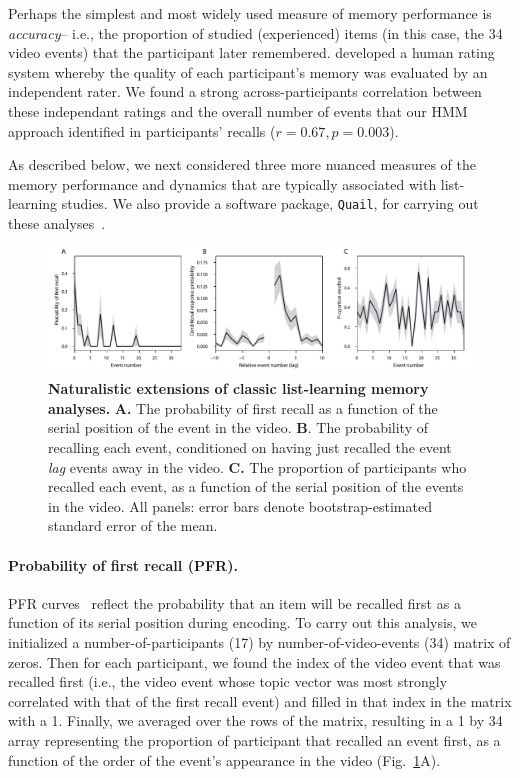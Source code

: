 \documentclass{article}
\begin{document}
Perhaps the simplest and most widely used measure of memory performance is \textit{accuracy}-- i.e., the proportion of studied (experienced) items (in this case, the 34 video events) that the participant later remembered.  \cite{ChenEtal17} developed a human rating system whereby the quality of each participant's memory was evaluated by an independent rater.  We found a strong across-participants correlation between these independant ratings and the overall number of events that our HMM approach identified in participants' recalls ($r = 0.67, p = 0.003$).

As described below, we next considered three more nuanced measures of the memory performance and dynamics that are typically associated with list-learning studies.  We also provide a software package, \texttt{Quail}, for carrying out these analyses~\citep{HeusEtal17b}.

\begin{figure}[tb]
\centering
\includegraphics[width=1\textwidth]{figs/list_learning}
\caption{\small \textbf{Naturalistic extensions of classic list-learning memory analyses.} \textbf{A.} The probability of first recall as a function of the serial position of the event in the video. \textbf{B}.  The probability of recalling each event, conditioned on having just recalled the event \textit{lag} events away in the video.  \textbf{C.} The proportion of participants who recalled each event, as a function of the serial position of the events in the video.  All panels: error bars denote bootstrap-estimated standard error of the mean.}
\label{fig:list-learning}
\end{figure}

\paragraph{Probability of first recall (PFR).}  PFR curves~\citep{WelcBurn24, PostPhil65, AtkiShif68} reflect the probability that an item will be recalled first as a function of its serial position during encoding. To carry out this analysis, we initialized a number-of-participants (17) by number-of-video-events (34) matrix of zeros. Then for each participant, we found the index of the video event that was recalled first (i.e., the video event whose topic vector was most strongly correlated with that of the first recall event) and filled in that index in the matrix with a 1.  Finally, we averaged over the rows of the matrix, resulting in a 1 by 34 array representing the proportion of participant that recalled an event first, as a function of the order of the event's appearance in the video (Fig.~\ref{fig:list-learning}A).
\end{document}
